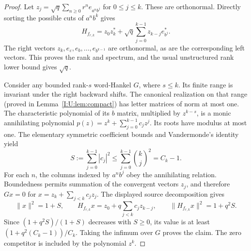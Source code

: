 \begin{proof}
Let $z_j=\sqrt q\sum_{n\ge0}r^n e_{a^n b^j}$ for $0\le j\le k$.
These are orthonormal. Directly sorting the possible cuts of $a^n b^k$ gives
\[
 H_{f_{r,k}}=z_0z_k^*+\sqrt q\sum_{j=0}^{k-1}z_{k-j}e_{b^j}^*.
\]
The right vectors $z_k,e_\varepsilon,e_b,\ldots,e_{b^{k-1}}$ are
orthonormal, as are the corresponding left vectors. This proves the rank and
spectrum, and the usual unstructured rank lower bound gives $\sqrt q$.

Consider any bounded rank-$s$ word-Hankel $G$, where $s\le k$. Its finite
range is invariant under the right backward shifts. The canonical realization
on that range (proved in Lemma~\ref{I:U:lem:compact}) has letter matrices of norm
at most one. The characteristic polynomial of its $b$ matrix, multiplied
by $z^{k-s}$, is a monic annihilating polynomial
$p(z)=z^k+\sum_{j=0}^{k-1}c_jz^j$. Its roots have modulus at most one.
The elementary symmetric coefficient bounds and Vandermonde's identity yield
\[
 S:=\sum_{j=0}^{k-1}|c_j|^2\le\sum_{j=0}^{k-1}\binom{k}{j}^2=C_k-1.
\]
For each $n$, the columns indexed by $a^n b^j$ obey the annihilating
relation. Boundedness permits summation of the convergent vectors $z_j$,
and therefore $Gx=0$ for $x=z_k+\sum_{j<k}c_jz_j$.
The displayed source decomposition gives
\[
 \|x\|^2=1+S,\qquad
 H_{f_{r,k}}x=z_0+q\sum_{j<k}c_jz_{k-j},\qquad
 \|H_{f_{r,k}}x\|^2=1+q^2S.
\]
Since $(1+q^2S)/(1+S)$ decreases with $S\ge0$, its value is at least
$(1+q^2(C_k-1))/C_k$. Taking the infimum over $G$ proves the claim.
The zero competitor is included by the polynomial $z^k$.
\end{proof}
